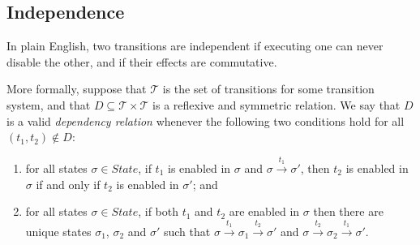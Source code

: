 \documentclass[12pt,a4paper,twoside,openright]{report}
\begin{document}
\subsection{Independence} \label{sec:independence}
In plain English, two transitions are independent if executing one
can never disable the other, and if their effects are commutative.

More formally, suppose that $\mathcal{T}$ is the set of
transitions for some transition system, and
that $D \subseteq \mathcal{T} \times \mathcal{T}$
is a reflexive and symmetric relation. We say
that $D$ is a valid \emph{dependency relation}
whenever the following two conditions hold for
all $(t_1, t_2) \not \in D$:
\begin{enumerate}
	\item for all states $\sigma \in \textit{State}$,
		if $t_1$ is enabled in $\sigma$ and
		$\sigma \xrightarrow{t_1} \sigma'$, then
		$t_2$ is enabled in $\sigma$ if and only if
		$t_2$ is enabled in $\sigma'$; and
	\item for all states $\sigma \in \textit{State}$,
		if both $t_1$ and $t_2$ are enabled in $\sigma$
		then there are unique states $\sigma_1$, $\sigma_2$ and
		$\sigma'$ such that
		$\sigma \xrightarrow{t_1} \sigma_1 \xrightarrow{t_2} \sigma'$
		and
		$\sigma \xrightarrow{t_2} \sigma_2 \xrightarrow{t_1} \sigma'$.
\end{enumerate}
\end{document}
